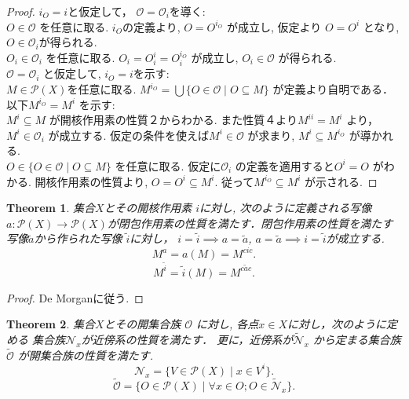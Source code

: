 \documentclass[lualatex]{ltjsbook}
\newtheorem{theorem}{Theorem}[section]
\theoremstyle{remark}
\theoremstyle{plain}
\begin{document}
\begin{proof}
	$i_O = i $と仮定して， $\mathcal{O} = \mathcal{O}_i$を導く:\\
	$O \in \mathcal{O}$ を任意に取る. $i_O$の定義より,  $O = O^{i_O}$ が成立し, 
	仮定より $O = O ^{i}$ となり, $O \in \mathcal{O}_i$が得られる.\\
	$O_i \in \mathcal{O}_i$ を任意に取る. $O_i = O_i^{i} = O_i^{i_O}$ が成立し, $O_i \in \mathcal{O}$ が得られる.\\
	$\mathcal{O} = \mathcal{O}_i$ と仮定して, $i_O =i$を示す:\\
	 $M \in \mathcal{P}(X)$を任意に取る. 
	 $M ^{i_O} = \bigcup \{O \in \mathcal{O} \mid O\subseteq M\} $ が定義より自明である．\\
	 以下$M^{i_O} = M^{i}$ を示す:\\
	 $M^{i} \subseteq M$ が開核作用素の性質２からわかる.
	 また性質４より$M^{ii}=M^{i}$ より，$M^{i} \in \mathcal{O}_i$ が成立する. 
	 仮定の条件を使えば$M^{i} \in \mathcal{O}$ が求まり, $M^{i} \subseteq M^{i_O}$ が導かれる.\\
	 $O \in \{O \in \mathcal{O} \mid O\subseteq M\} $ を任意に取る. 
	 仮定に$\mathcal{O}_i$ の定義を適用すると$O^{i}= O$ がわかる.
	 開核作用素の性質より, $O = O^{i} \subseteq M^{i}$. 従って$M^{i_O} \subseteq  M^{i}$ が示される.
\end{proof}

\begin{theorem}
	集合$X$とその開核作用素 $i$に対し,  次のように定義される写像$a : \mathcal{P}(X) \to \mathcal{P}(X)$が閉包作用素の性質を満たす．閉包作用素の性質を満たす写像$\tilde{a}$から作られた写像 $\tilde{i}$に対し，  $ i = \tilde{i} \implies a = \tilde{a}$, $a =\tilde{a} \implies i = \tilde{i}$が成立する.
	\[
		M^{a}= a(M) = M^{cic}
	.\] 
	\[
		M^{\tilde{i}}= \tilde{i}(M) = M^{c\tilde{a}c}
	.\] 
\end{theorem}

\begin{proof}
	De Morganに従う.
\end{proof}

\begin{theorem}
	集合$X$とその開集合族 $\mathcal{O}$ に対し, 各点$x \in X$に対し，次のように定める 集合族$\mathcal{N}_x$が近傍系の性質を満たす． 更に，近傍系が$\mathcal{\tilde{N}}_x$ から定まる集合族$\tilde{\mathcal{O}}$ が開集合族の性質を満たす.
	\[
	 \mathcal{N}_x =\{ V \in \mathcal{P}(X)  \mid  x \in V^{i}\} 
	.\] 
	\[
		\tilde{\mathcal{O}}= \{ O \in \mathcal{P}(X)  \mid \forall x \in O; O \in \mathcal{\tilde{N}}_x\} 
	.\] 
\end{theorem}
\end{document}
